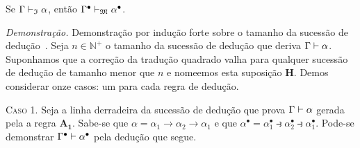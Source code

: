     \vspace{.5\baselineskip}
    \begin{tcolorbox}[enhanced jigsaw, breakable, sharp corners, colframe=black, colback=white, boxrule=0.5pt, left=1.5mm, right=1.5mm, top=1.5mm, bottom=1.5mm]
    \begin{theorem}\label{square.soundness}
        Se $\Gamma\mathrel{\vdash}_\mathfrak{I}\alpha$, então $\Gamma^\bullet\mathrel{\vdash}_\mathfrak{M}\alpha^\bullet$.
    \end{theorem}

        \emph{Demonstração.}
        Demonstração por indução forte sobre o tamanho da sucessão de dedução~\citep{Troelstra+Schwichtenberg.2000}.
        Seja $n\in\mathbb{N}^+$ o tamanho da sucessão de dedução que deriva $\Gamma\mathrel{\vdash}\alpha$.
        Suponhamos que a correção da tradução quadrado valha para qualquer sucessão de dedução de tamanho menor que $n$ e nomeemos esta suposição $\mathbf{H}$.
        Demos considerar onze casos: um para cada regra de dedução.

        \vspace{.5\baselineskip}
        \textsc{Caso 1.}
        Seja a linha derradeira da sucessão de dedução que prova $\Gamma\mathrel{\vdash}\alpha$ gerada pela a regra $\hyperref[intuitionistic.axiom.1]{\mathbf{A_1}}$.
        Sabe-se que $\alpha=\alpha_1\to\alpha_2\to\alpha_1$ e que $\alpha^\bullet=\alpha_1^\bullet\strictif\alpha_2^\bullet\strictif\alpha_1^\bullet$.
        Pode-se demonstrar $\Gamma^\bullet\mathrel{\vdash}\alpha^\bullet$ pela dedução que segue.


\end{tcolorbox}
